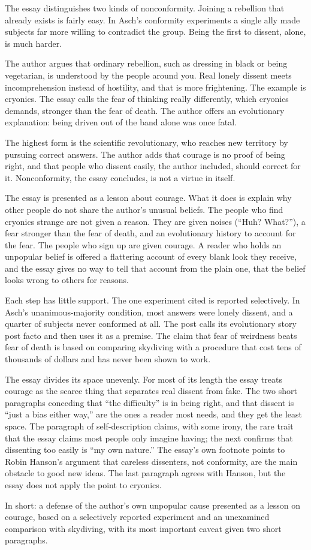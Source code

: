 \begin{afterword}
\summaryhead

The essay distinguishes two kinds of nonconformity. Joining a rebellion that already exists is fairly easy. In Asch's conformity experiments a single ally made subjects far more willing to contradict the group. Being the first to dissent, alone, is much harder.

The author argues that ordinary rebellion, such as dressing in black or being vegetarian, is understood by the people around you. Real lonely dissent meets incomprehension instead of hostility, and that is more frightening. The example is cryonics. The essay calls the fear of thinking really differently, which cryonics demands, stronger than the fear of death. The author offers an evolutionary explanation: being driven out of the band alone was once fatal.

The highest form is the scientific revolutionary, who reaches new territory by pursuing correct answers. The author adds that courage is no proof of being right, and that people who dissent easily, the author included, should correct for it. Nonconformity, the essay concludes, is not a virtue in itself.

\responsehead

The essay is presented as a lesson about courage. What it does is explain why other people do not share the author's unusual beliefs. The people who find cryonics strange are not given a reason. They are given noises (``Huh? What?''), a fear stronger than the fear of death, and an evolutionary history to account for the fear. The people who sign up are given courage. A reader who holds an unpopular belief is offered a flattering account of every blank look they receive, and the essay gives no way to tell that account from the plain one, that the belief looks wrong to others for reasons.

Each step has little support. The one experiment cited is reported selectively. In Asch's unanimous-majority condition, most answers were lonely dissent, and a quarter of subjects never conformed at all. The post calls its evolutionary story post facto and then uses it as a premise. The claim that fear of weirdness beats fear of death is based on comparing skydiving with a procedure that cost tens of thousands of dollars and has never been shown to work.

The essay divides its space unevenly. For most of its length the essay treats courage as the scarce thing that separates real dissent from fake. The two short paragraphs conceding that ``the difficulty'' is in being right, and that dissent is ``just a bias either way,'' are the ones a reader most needs, and they get the least space. The paragraph of self-description claims, with some irony, the rare trait that the essay claims most people only imagine having; the next confirms that dissenting too easily is ``my own nature.'' The essay's own footnote points to Robin Hanson's argument that careless dissenters, not conformity, are the main obstacle to good new ideas. The last paragraph agrees with Hanson, but the essay does not apply the point to cryonics.

In short: a defense of the author's own unpopular cause presented as a lesson on courage, based on a selectively reported experiment and an unexamined comparison with skydiving, with its most important caveat given two short paragraphs.
\end{afterword}

